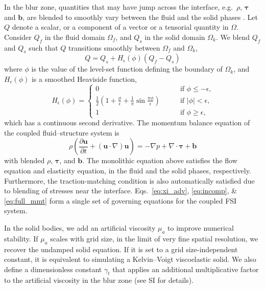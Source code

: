 \documentclass[times, 10pt]{article}
\renewcommand{\vec}[1]{\mathbf{#1}}
\newcommand{\vu}{\vec{u}}
\newcommand{\vtau}{\boldsymbol\tau}
\begin{document}
\begin{multicols}{2}
In the blur zone, quantities that may have jump across the interface, e.g.~$\rho$, $\vtau$ and $\mathbf b$, are blended to smoothly vary between the fluid and the solid phases \cite{sussman94,sussman99,yu03}.
Let $Q$ denote a scalar, or a component of a vector or a tensorial quantity in $\Omega$.
Consider $Q_f$ in the fluid domain $\Omega_f$, and $Q_s$ in the solid domain $\Omega_k$.
We blend $Q_f$ and $Q_s$ such that $Q$ transitions smoothly between $\Omega_f$ and $\Omega_k$,
%
\begin{equation}
\label{eq:blend}
Q = Q_s + H_\epsilon(\phi) (Q_f - Q_s)
\end{equation}
%
where $\phi$ is the value of the level-set function defining the boundary of $\Omega_k$, and $H_\epsilon(\phi)$ is a smoothed Heaviside function,
%
\begin{equation}
  \label{eq:sm_heavi}
  H_\epsilon(\phi) =
  \left\{
  \begin{array}{ll}
    0 & \qquad \text{if $\phi\le-\epsilon$,} \\
    \frac{1}{2} (1+\frac{\phi}{\epsilon}+\frac{1}{\pi} \sin \frac{\pi \phi}{\epsilon}) & \qquad \text{if $|\phi|<\epsilon$,} \\
    1 & \qquad \text{if $\phi\ge\epsilon$},
  \end{array}
  \right.
\end{equation}
%
which has a continuous second derivative.
The momentum balance equation of the coupled fluid--structure system is
%
\begin{equation}
\label{eq:full_mmt}
\rho \left (\frac{\partial \vu}{\partial t}
 + ( \vu \cdot \nabla ) \vu \right) = - \nabla p +\nabla \cdot \vtau + \mathbf b
\end{equation}
%
with blended $\rho$, $\vtau$, and $\mathbf b$. The monolithic equation above satisfies the flow equation and elasticity equation, in the fluid and the solid phases, respectively.
Furthermore, the traction-matching condition is also automatically satisfied due to blending of stresses near the interface.
Eqs.~\eqref{eq:xi_adv}, \eqref{eq:incomp}, \& \eqref{eq:full_mmt}
form a single set of governing equations for the coupled FSI system.

In the solid bodies, we add an artificial viscosity $\mu_a$ to improve numerical stability.
If $\mu_a$ scales with grid size, in the limit of very fine spatial resolution, we recover the undamped solid equation.
If it is set to a grid size-independent constant, it is equivalent to simulating a Kelvin--Voigt viscoelastic solid.
We also define a dimensionless constant $\gamma_t$ that applies an additional multiplicative factor to the artificial viscosity in the blur zone (see SI for details).


\end{multicols}
\end{document}
